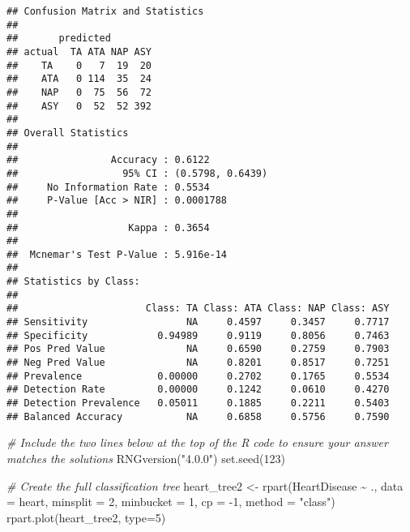 \documentclass[
]{article}
\newenvironment{Shaded}{\begin{snugshade}}{\end{snugshade}}
\newcommand{\AttributeTok}[1]{\textcolor[rgb]{0.77,0.63,0.00}{#1}}
\newcommand{\CommentTok}[1]{\textcolor[rgb]{0.56,0.35,0.01}{\textit{#1}}}
\newcommand{\DecValTok}[1]{\textcolor[rgb]{0.00,0.00,0.81}{#1}}
\newcommand{\FunctionTok}[1]{\textcolor[rgb]{0.00,0.00,0.00}{#1}}
\newcommand{\NormalTok}[1]{#1}
\newcommand{\OtherTok}[1]{\textcolor[rgb]{0.56,0.35,0.01}{#1}}
\newcommand{\SpecialCharTok}[1]{\textcolor[rgb]{0.00,0.00,0.00}{#1}}
\newcommand{\StringTok}[1]{\textcolor[rgb]{0.31,0.60,0.02}{#1}}
\begin{document}
\begin{verbatim}
## Confusion Matrix and Statistics
## 
##       predicted
## actual  TA ATA NAP ASY
##    TA    0   7  19  20
##    ATA   0 114  35  24
##    NAP   0  75  56  72
##    ASY   0  52  52 392
## 
## Overall Statistics
##                                           
##                Accuracy : 0.6122          
##                  95% CI : (0.5798, 0.6439)
##     No Information Rate : 0.5534          
##     P-Value [Acc > NIR] : 0.0001788       
##                                           
##                   Kappa : 0.3654          
##                                           
##  Mcnemar's Test P-Value : 5.916e-14       
## 
## Statistics by Class:
## 
##                      Class: TA Class: ATA Class: NAP Class: ASY
## Sensitivity                 NA     0.4597     0.3457     0.7717
## Specificity            0.94989     0.9119     0.8056     0.7463
## Pos Pred Value              NA     0.6590     0.2759     0.7903
## Neg Pred Value              NA     0.8201     0.8517     0.7251
## Prevalence             0.00000     0.2702     0.1765     0.5534
## Detection Rate         0.00000     0.1242     0.0610     0.4270
## Detection Prevalence   0.05011     0.1885     0.2211     0.5403
## Balanced Accuracy           NA     0.6858     0.5756     0.7590
\end{verbatim}

\begin{Shaded}
\begin{Highlighting}[]
\CommentTok{\# Include the two lines below at the top of the R code to ensure your answer matches the solutions}
\FunctionTok{RNGversion}\NormalTok{(}\StringTok{"4.0.0"}\NormalTok{)}
\FunctionTok{set.seed}\NormalTok{(}\DecValTok{123}\NormalTok{)}


\CommentTok{\# Create the full classification tree}
\NormalTok{heart\_tree2 }\OtherTok{\textless{}{-}} \FunctionTok{rpart}\NormalTok{(HeartDisease }\SpecialCharTok{\textasciitilde{}}\NormalTok{ .,}
                   \AttributeTok{data =}\NormalTok{ heart,}
                   \AttributeTok{minsplit =} \DecValTok{2}\NormalTok{,}
                   \AttributeTok{minbucket =} \DecValTok{1}\NormalTok{,}
                   \AttributeTok{cp =} \SpecialCharTok{{-}}\DecValTok{1}\NormalTok{,}
                   \AttributeTok{method =} \StringTok{"class"}\NormalTok{)}
\FunctionTok{rpart.plot}\NormalTok{(heart\_tree2, }\AttributeTok{type=}\DecValTok{5}\NormalTok{)}
\end{Highlighting}
\end{Shaded}
\end{document}

